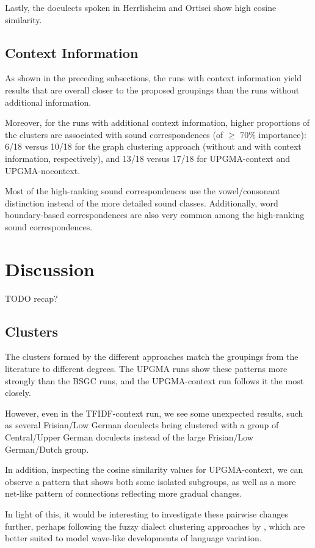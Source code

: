 \documentclass[a4paper]{article}
\begin{document}
Lastly, the doculects spoken in Herrlisheim and Ortisei
show high cosine similarity.

\subsection{Context Information}

As shown in the preceding subsections,
the runs with context information yield results
that are overall closer to the proposed groupings
than the runs without additional information.

Moreover, for the runs with additional context information,
higher proportions of the clusters are associated with
sound correspondences (of $\geq$ 70\% importance):
6/18 versus 10/18 for the graph clustering approach
(without and with context information, respectively),
and 13/18 versus 17/18 for UPGMA-context and UPGMA-nocontext.

Most of the high-ranking sound correspondences
use the vowel/consonant distinction instead of
the more detailed sound classes.
Additionally, word boundary-based correspondences are also very common
among the high-ranking sound correspondences.

\section{Discussion}
\label{sec:discussion}

TODO recap?

\subsection{Clusters}
The clusters formed by the different approaches
match the groupings from the literature to different degrees.
The UPGMA runs show these patterns more strongly than the BSGC runs,
and the UPGMA-context run follows it the most closely.

However, even in the TFIDF-context run,
we see some unexpected results,
such as several Frisian/Low German doculects
being clustered with a group of Central/Upper German doculects
instead of the large Frisian/Low German/Dutch group.

In addition, inspecting the cosine similarity values
for UPGMA-context, we can observe a pattern
that shows both some isolated subgroups, as well as
a more net-like pattern of connections
reflecting more gradual changes.

In light of this, it would be interesting
to investigate these pairwise changes further,
perhaps following the fuzzy dialect clustering approaches
by \citet{proell2013detecting}, which are better suited to model
wave-like developments of language variation.
\end{document}

